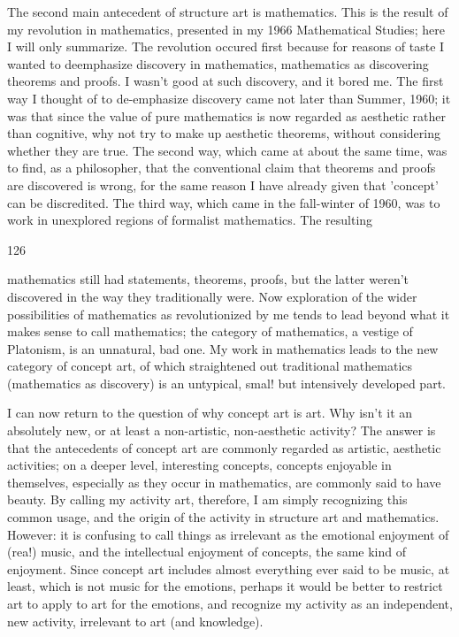 \documentclass[10pt,twoside]{memoir}
\begin{document}
\begin{enumerate}
{\begin{enumerate}
\begin{sysrules}
\begin{sysrules}
\begin{sysrules}
\begin{sysrules}
{\begin{enumerate}
{{The second main antecedent of structure art is mathematics. This is the 
result of my revolution in mathematics, presented in my 1966 Mathematical 
Studies; here I will only summarize. The revolution occured first because for 
reasons of taste I wanted to deemphasize discovery in mathematics, 
mathematics as discovering theorems and proofs. I wasn't good at such 
discovery, and it bored me. The first way I thought of to de-emphasize 
discovery came not later than Summer, 1960; it was that since the value of 
pure mathematics is now regarded as aesthetic rather than cognitive, why not 
try to make up aesthetic theorems, without considering whether they are 
true. The second way, which came at about the same time, was to find, as a 
philosopher, that the conventional claim that theorems and proofs are 
discovered is wrong, for the same reason I have already given that 'concept' 
can be discredited. The third way, which came in the fall-winter of 1960, 
was to work in unexplored regions of formalist mathematics. The resulting 


126 


mathematics still had statements, theorems, proofs, but the latter weren't 
discovered in the way they traditionally were. Now exploration of the wider 
possibilities of mathematics as revolutionized by me tends to lead beyond 
what it makes sense to call mathematics; the category of mathematics, a 
vestige of Platonism, is an unnatural, bad one. My work in mathematics leads 
to the new category of concept art, of which straightened out traditional 
mathematics (mathematics as discovery) is an untypical, smal! but 
intensively developed part. 

I can now return to the question of why concept art is art. Why isn't it an 
absolutely new, or at least a non-artistic, non-aesthetic activity? The answer 
is that the antecedents of concept art are commonly regarded as artistic, 
aesthetic activities; on a deeper level, interesting concepts, concepts 
enjoyable in themselves, especially as they occur in mathematics, are 
commonly said to have beauty. By calling my activity art, therefore, I am 
simply recognizing this common usage, and the origin of the activity in 
structure art and mathematics. However: it is confusing to call things as 
irrelevant as the emotional enjoyment of (rea!) music, and the intellectual 
enjoyment of concepts, the same kind of enjoyment. Since concept art 
includes almost everything ever said to be music, at least, which is not music 
for the emotions, perhaps it would be better to restrict art to apply to art for 
the emotions, and recognize my activity as an independent, new activity, 
irrelevant to art (and knowledge). 


}}
\end{enumerate}}
\end{sysrules}
\end{sysrules}
\end{sysrules}
\end{sysrules}
\end{enumerate}}
\end{enumerate}
\end{document}
